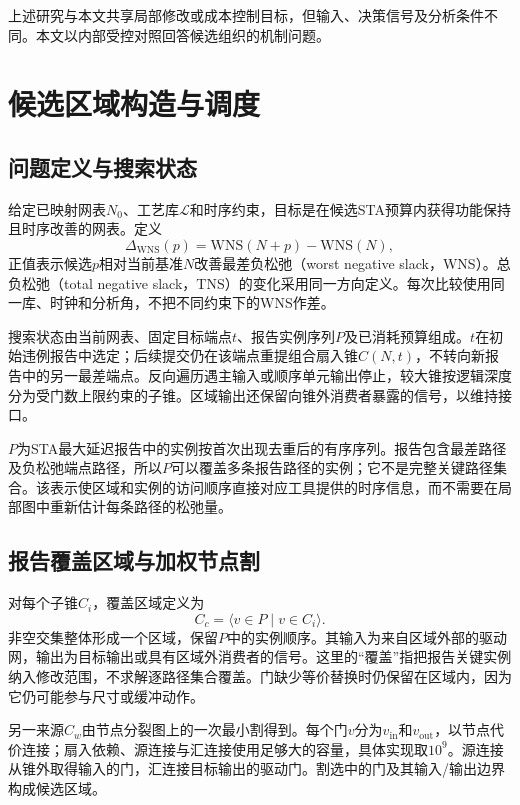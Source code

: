 \documentclass[twocolumn,10pt,fontset=windows]{ctexart}
\begin{document}
上述研究与本文共享局部修改或成本控制目标，但输入、决策信号及分析条件不同。本文以内部受控对照回答候选组织的机制问题。

\section{候选区域构造与调度}

\subsection{问题定义与搜索状态}

给定已映射网表$N_0$、工艺库$\mathcal L$和时序约束，目标是在候选STA预算内获得功能保持且时序改善的网表。定义
\begin{equation}\label{eq:gain}
\Delta_{\mathrm{WNS}}(p)=\mathrm{WNS}(N+p)-\mathrm{WNS}(N),
\end{equation}
正值表示候选$p$相对当前基准$N$改善最差负松弛（worst negative slack，WNS）。总负松弛（total negative slack，TNS）的变化采用同一方向定义。每次比较使用同一库、时钟和分析角，不把不同约束下的WNS作差。

搜索状态由当前网表、固定目标端点$t$、报告实例序列$P$及已消耗预算组成。$t$在初始违例报告中选定；后续提交仍在该端点重提组合扇入锥$C(N,t)$，不转向新报告中的另一最差端点。反向遍历遇主输入或顺序单元输出停止，较大锥按逻辑深度分为受门数上限约束的子锥。区域输出还保留向锥外消费者暴露的信号，以维持接口。

$P$为STA最大延迟报告中的实例按首次出现去重后的有序序列。报告包含最差路径及负松弛端点路径，所以$P$可以覆盖多条报告路径的实例；它不是完整关键路径集合。该表示使区域和实例的访问顺序直接对应工具提供的时序信息，而不需要在局部图中重新估计每条路径的松弛量。

\subsection{报告覆盖区域与加权节点割}\label{sec:regions}

对每个子锥$C_i$，覆盖区域定义为
\begin{equation}\label{eq:cover_region}
C_c=\langle v\in P\mid v\in C_i\rangle.
\end{equation}
非空交集整体形成一个区域，保留$P$中的实例顺序。其输入为来自区域外部的驱动网，输出为目标输出或具有区域外消费者的信号。这里的“覆盖”指把报告关键实例纳入修改范围，不求解逐路径集合覆盖。门缺少等价替换时仍保留在区域内，因为它仍可能参与尺寸或缓冲动作。

另一来源$C_w$由节点分裂图上的一次最小割得到。每个门$v$分为$v_{\mathrm{in}}$和$v_{\mathrm{out}}$，以节点代价连接；扇入依赖、源连接与汇连接使用足够大的容量，具体实现取$10^9$。源连接从锥外取得输入的门，汇连接目标输出的驱动门。割选中的门及其输入/输出边界构成候选区域。
\end{document}
